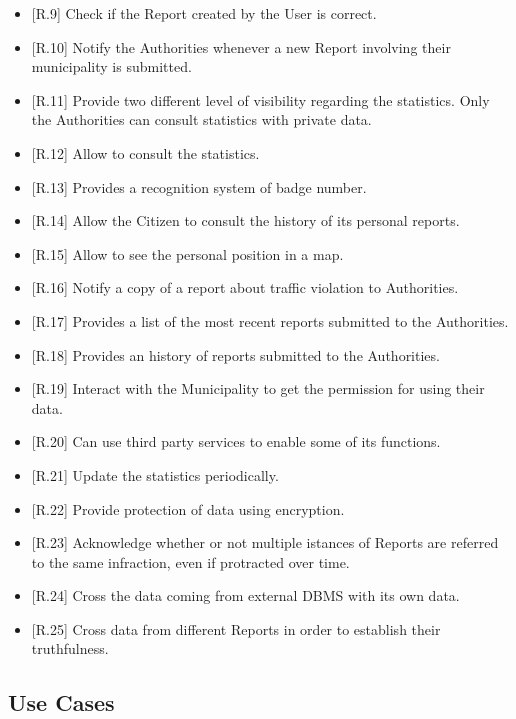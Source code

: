 \documentclass{report}
\begin{document}
\begin{itemize}
	\item {[R.9]} Check if the Report created by the User is correct.
	\item {[R.10]} Notify the Authorities whenever a new Report involving their municipality is submitted. 
	\item {[R.11]} Provide two different level of visibility regarding the statistics. Only the Authorities can consult statistics with private data.
	\item {[R.12]} Allow to consult the statistics.
	\item {[R.13]} Provides a recognition system of badge number.
	\item {[R.14]} Allow the Citizen to consult the history of its personal reports.
	\item {[R.15]} Allow to see the personal position in a map.
	\item {[R.16]} Notify a copy of a report about traffic violation to Authorities.
	\item {[R.17]} Provides a list of the most recent reports submitted to the Authorities.
	\item {[R.18]} Provides an history of reports submitted to the Authorities.
	\item {[R.19]} Interact with the Municipality to get the permission for using their data.
	\item {[R.20]} Can use third party services to enable some of its functions.
	\item {[R.21]} Update the statistics periodically.
	\item {[R.22]} Provide protection of data using encryption.
	\item {[R.23]} Acknowledge whether or not multiple istances of Reports are referred to the same infraction, even if protracted over time.
	\item {[R.24]} Cross the data coming from external DBMS with its own data.
	\item {[R.25]} Cross data from different Reports in order to establish their truthfulness.
\end{itemize}

\newpage

\subsection{Use Cases}
\end{document}

